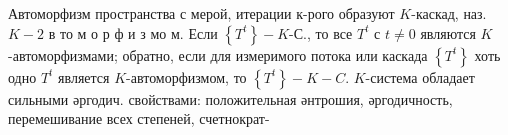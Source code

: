 \documentclass[10pt]{article}
\begin{document}
Автоморфизм пространства с мерой, итерации к-рого образуют $K$-каскад, наз. $K-2$ в то м о р ф и з мо м. Если $\left\{T^{t}\right\}-K$-С., то все $T^{t}$ с $t \neq 0$ являются $K$-автоморфизмами; обратно, если для измеримого потока или каскада $\left\{T^{t}\right\}$ хоть одно $T^{t}$ является $K$-автоморфизмом, то $\left\{T^{t}\right\}-K-C$. $K$-система обладает сильными әргодич. свойствами: положительная әнтрошия, әргодичность, перемешивание всех степеней, счетнократ-
\end{document}
